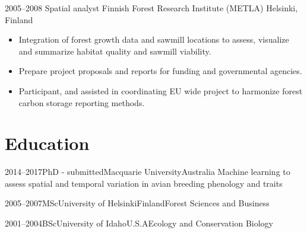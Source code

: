 \documentclass[11pt,a4paper,sans]{moderncv}        %
\begin{document}
\cventry
  {2005--2008}
  {Spatial analyst}
  {Finnish Forest Research Institute (METLA)}
  {Helsinki, Finland}
  {}
  {\begin{itemize}
  \item Integration of forest growth data and sawmill locations to assess, visualize and summarize habitat quality and sawmill viability. 
  \item Prepare project proposals and reports for funding and governmental agencies.
  \item Participant, and assisted in coordinating EU wide project to harmonize forest carbon storage reporting methods. 
  \end{itemize}
  }

\section{Education}

\cventry
    {2014--2017}{PhD - submitted}{Macquarie University}{Australia}
    {Machine learning to assess spatial and temporal variation in avian breeding phenology and traits}{}
    
\cventry
    {2005--2007}{MSc}{University of Helsinki}{Finland}{Forest Sciences and Business}{}

\cventry
    {2001--2004}{BSc}{University of Idaho}{U.S.A}{Ecology and Conservation Biology}{}

% 
% 
\end{document}
